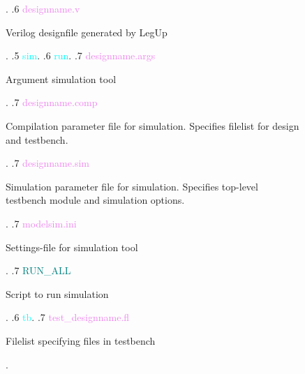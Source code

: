 \begin{figure}
\begin{minipage}{0.99\textwidth}
{\begin{minipage}[t]{5.4cm}
                                                    \end{minipage}.
    .6 \textcolor{violet}{designname{.}v} \dotfill \:\:\begin{minipage}[t]{5.4cm}
                                                    Verilog designfile generated by LegUp
                                                    \end{minipage}.
    .5 \textcolor{cyan}{sim}.
    .6 \textcolor{cyan}{run}.
    .7 \textcolor{violet}{designname{.}args} \dotfill \:\:\begin{minipage}[t]{5.4cm}
                                                            Argument simulation tool
                                                            \end{minipage}.
    .7 \textcolor{violet}{designname{.}comp} \dotfill \:\:\begin{minipage}[t]{5.4cm}
                                                            Compilation parameter file for simulation{.} Specifies filelist for design and testbench{.}
                                                            \end{minipage}.
    .7 \textcolor{violet}{designname{.}sim} \dotfill \:\:\begin{minipage}[t]{5.4cm}
                                                            Simulation parameter file for simulation{.} Specifies top-level testbench module and simulation options{.}
                                                            \end{minipage}.
    .7 \textcolor{violet}{modelsim{.}ini} \dotfill \:\:\begin{minipage}[t]{5.4cm}
                                                            Settings-file for simulation tool
                                                            \end{minipage}.
    .7 \textcolor{teal}{RUN\_ALL} \dotfill \:\:\begin{minipage}[t]{5.4cm}
                                                            Script to run simulation
                                                            \end{minipage}.
    .6 \textcolor{cyan}{tb}.
    .7 \textcolor{violet}{test\_designname{.}fl} \dotfill \:\:\begin{minipage}[t]{5.4cm}
                                                    Filelist specifying files in testbench
                                                    \end{minipage}.
}
\end{minipage}
\end{figure}
